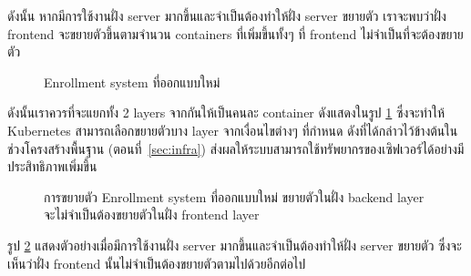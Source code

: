 %
ดังนั้น หากมีการใช้งานฝั่ง server มากขึ้นและจำเป็นต้องทำให้ฝั่ง server ขยายตัว เราจะพบว่าฝั่ง frontend จะขยายตัวขึ้นตามจำนวน containers ที่เพิ่มขึ้นทั้งๆ ที่ frontend ไม่จำเป็นที่จะต้องขยายตัว

\begin{figure}
    \centering
    \begin{center}
    \end{center}
    \caption[Poem]{Enrollment system ที่ออกแบบใหม่}
    \label{fig:new_regist_system}
\end{figure}
%
ดังนั้นเราควรที่จะแยกทั้ง 2 layers จากกันให้เป็นคนละ container ดังแสดงในรูป \ref{fig:new_regist_system} ซึ่งจะทำให้ Kubernetes สามารถเลือกขยายตัวบาง layer จากเงื่อนไขต่างๆ ที่กำหนด ดังที่ได้กล่าวไว้ข้างต้นในช่วงโครงสร้างพื้นฐาน (ตอนที่~\ref{sec:infra}) ส่งผลให้ระบบสามารถใช้ทรัพยากรของเซิฟเวอร์ได้อย่างมีประสิทธิภาพเพิ่มขึ้น
%
\begin{figure}
    \centering
    \begin{center}
    \end{center}
    \caption[Poem]{การขยายตัว Enrollment system ที่ออกแบบใหม่ ขยายตัวในฝั่ง backend layer จะไม่จำเป็นต้องขยายตัวในฝั่ง frontend layer}
    \label{fig:scaling_new_regist_system}
\end{figure}
%
รูป \ref{fig:scaling_new_regist_system} แสดงตัวอย่างเมื่อมีการใช้งานฝั่ง server มากขึ้นและจำเป็นต้องทำให้ฝั่ง server ขยายตัว ซึ่งจะเห็นว่าฝั่ง frontend นั้นไม่จำเป็นต้องขยายตัวตามไปด้วยอีกต่อไป

